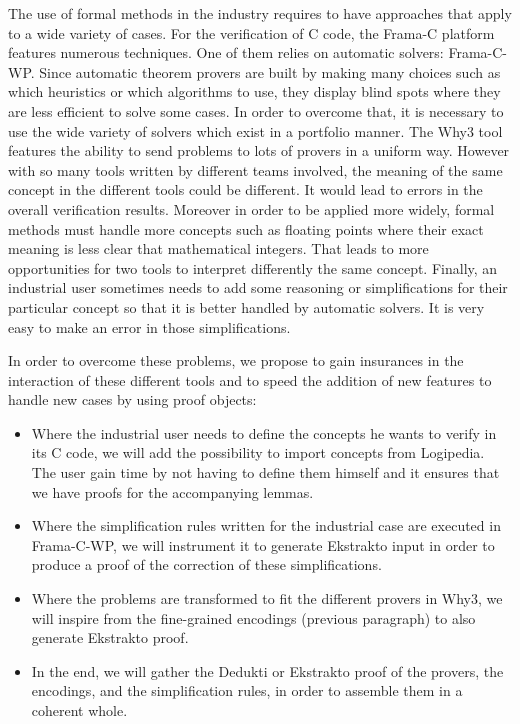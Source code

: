 The use of formal methods in the industry requires to have approaches
that apply to a wide variety of cases. For the verification of C code,
the Frama-C platform features numerous techniques. One of them relies
on automatic solvers: Frama-C-WP. Since automatic theorem provers are
built by making many choices such as which heuristics or which
algorithms to use, they display blind spots where they are less
efficient to solve some cases.  In order to overcome that, it is
necessary to use the wide variety of solvers which exist in a
portfolio manner. The Why3 tool features the ability to send problems
to lots of provers in a uniform way. However with so many tools
written by different teams involved, the meaning of the same concept
in the different tools could be different. It would lead to errors in
the overall verification results. Moreover in order to be applied more
widely, formal methods must handle more concepts such as floating
points where their exact meaning is less clear that mathematical
integers. That leads to more opportunities for two tools to interpret
differently the same concept. Finally, an industrial user sometimes
needs to add some reasoning or simplifications for their particular
concept so that it is better handled by automatic solvers. It is very
easy to make an error in those simplifications.

In order to overcome these problems, we propose to gain insurances in
the interaction of these different tools and to speed the addition of
new features to handle new cases by using proof objects:
\begin{itemize}
\item Where the industrial user needs to define the concepts he wants
  to verify in its C code, we will add the possibility to import
  concepts from Logipedia. The user gain time by not having to define
  them himself and it ensures that we have proofs for the accompanying
  lemmas.

\item Where the simplification rules written for the industrial case
  are executed in Frama-C-WP, we will instrument it to generate
  Ekstrakto input in order to produce a proof of the correction of
  these simplifications.

\item Where the problems are transformed to fit the different provers
  in Why3, we will inspire from the fine-grained encodings (previous
  paragraph) to also generate Ekstrakto proof.

\item In the end, we will gather the Dedukti or Ekstrakto proof of the
  provers, the encodings, and the simplification rules, in order to
  assemble them in a coherent whole.
\end{itemize}

